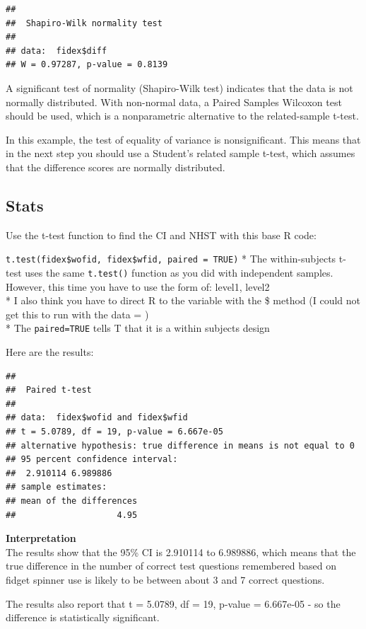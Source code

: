 \documentclass[
]{book}
\begin{document}
\begin{verbatim}
## 
##  Shapiro-Wilk normality test
## 
## data:  fidex$diff
## W = 0.97287, p-value = 0.8139
\end{verbatim}

A significant test of normality (Shapiro-Wilk test) indicates that the data is not normally distributed. With non-normal data, a Paired Samples Wilcoxon test should be used, which is a nonparametric alternative to the related-sample t-test.

In this example, the test of equality of variance is nonsignificant. This means that in the next step you should use a Student's related sample t-test, which assumes that the difference scores are normally distributed.

\hypertarget{stats}{%
\subsection{Stats}\label{stats}}

Use the t-test function to find the CI and NHST with this base R code:

\texttt{t.test(fidex\$wofid,\ fidex\$wfid,\ paired\ =\ TRUE)}
* The within-subjects t-test uses the same \texttt{t.test()} function as you did with independent samples. However, this time you have to use the form of: level1, level2\\
* I also think you have to direct R to the variable with the \$ method (I could not get this to run with the data = )\\
* The \texttt{paired=TRUE} tells T that it is a within subjects design

Here are the results:

\begin{verbatim}
## 
##  Paired t-test
## 
## data:  fidex$wofid and fidex$wfid
## t = 5.0789, df = 19, p-value = 6.667e-05
## alternative hypothesis: true difference in means is not equal to 0
## 95 percent confidence interval:
##  2.910114 6.989886
## sample estimates:
## mean of the differences 
##                    4.95
\end{verbatim}

\textbf{Interpretation}\\
The results show that the 95\% CI is 2.910114 to 6.989886, which means that the true difference in the number of correct test questions remembered based on fidget spinner use is likely to be between about 3 and 7 correct questions.

The results also report that t = 5.0789, df = 19, p-value = 6.667e-05 - so the difference is statistically significant.
\end{document}
